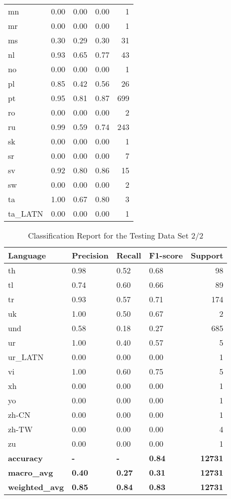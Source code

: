 \documentclass[fleqn,10pt]{SelfArx} %
\begin{document}
\begin{table*}[hbt]
\begin{tabular}{llllr}
	mn & 0.00 & 0.00 & 0.00 & 1\\
	mr & 0.00 & 0.00 & 0.00 & 1\\
	ms & 0.30 & 0.29 & 0.30 & 31\\
	nl & 0.93 & 0.65 & 0.77 & 43\\
	no & 0.00 & 0.00 & 0.00 & 1\\
	pl & 0.85 & 0.42 & 0.56 & 26\\
	pt & 0.95 & 0.81 & 0.87 & 699\\
	ro & 0.00 & 0.00 & 0.00 & 2\\
	ru & 0.99 & 0.59 & 0.74 & 243\\
	sk & 0.00 & 0.00 & 0.00 & 1\\
	sr & 0.00 & 0.00 & 0.00 & 7\\
	sv & 0.92 & 0.80 & 0.86 & 15\\
	sw & 0.00 & 0.00 & 0.00 & 2\\
	ta  & 1.00 & 0.67 & 0.80 & 3\\
	ta\_LATN & 0.00 & 0.00 & 0.00 & 1\\
      \bottomrule
	\end{tabular}
	\label{tab:label}
\end{table*}

\begin{table*}[hbt]
	\caption{Classification Report for the Testing Data Set  2/2}
	\centering
	\begin{tabular}{llllr}
	\toprule
	Language & Precision & Recall  & F1-score & Support \\
	\midrule
	th & 0.98 & 0.52 & 0.68 & 98\\
	tl & 0.74 & 0.60 & 0.66 & 89\\
	tr & 0.93 & 0.57 & 0.71 & 174\\
	uk & 1.00 & 0.50 & 0.67 & 2\\
	und & 0.58 & 0.18 & 0.27 & 685\\
	ur & 1.00 & 0.40 & 0.57 & 5\\
	ur\_LATN & 0.00 & 0.00 & 0.00 & 1\\
	vi & 1.00 & 0.60 & 0.75 & 5\\
	xh & 0.00 & 0.00 & 0.00 & 1\\
	yo & 0.00 & 0.00 & 0.00 & 1\\
	zh-CN & 0.00 & 0.00 & 0.00 & 1\\
	zh-TW & 0.00 & 0.00 & 0.00 & 4\\
	zu & 0.00 & 0.00 & 0.00 & 1\\
	\bf accuracy & \bf - & \bf - & \bf 0.84 & \bf 12731 \\
	\bf macro\_avg & \bf 0.40 & \bf 0.27 & \bf 0.31 & \bf 12731 \\
	\bf weighted\_avg & \bf 0.85 & \bf 0.84 & \bf 0.83 & \bf 12731\\
      \bottomrule
	\end{tabular}
	\label{tab:label}
\end{table*}

\end{document}
